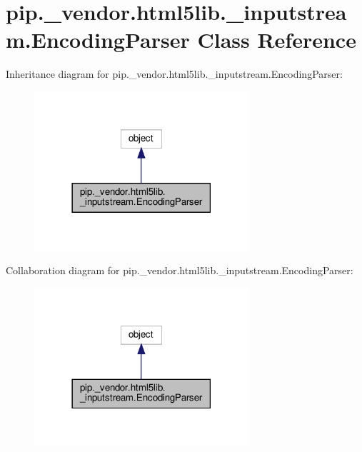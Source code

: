 \hypertarget{classpip_1_1__vendor_1_1html5lib_1_1__inputstream_1_1EncodingParser}{}\section{pip.\+\_\+vendor.\+html5lib.\+\_\+inputstream.\+Encoding\+Parser Class Reference}
\label{classpip_1_1__vendor_1_1html5lib_1_1__inputstream_1_1EncodingParser}


Inheritance diagram for pip.\+\_\+vendor.\+html5lib.\+\_\+inputstream.\+Encoding\+Parser\+:
\nopagebreak
\begin{figure}[H]
\begin{center}
\leavevmode
\includegraphics[width=225pt]{classpip_1_1__vendor_1_1html5lib_1_1__inputstream_1_1EncodingParser__inherit__graph}
\end{center}
\end{figure}


Collaboration diagram for pip.\+\_\+vendor.\+html5lib.\+\_\+inputstream.\+Encoding\+Parser\+:
\nopagebreak
\begin{figure}[H]
\begin{center}
\leavevmode
\includegraphics[width=225pt]{classpip_1_1__vendor_1_1html5lib_1_1__inputstream_1_1EncodingParser__coll__graph}
\end{center}
\end{figure}
